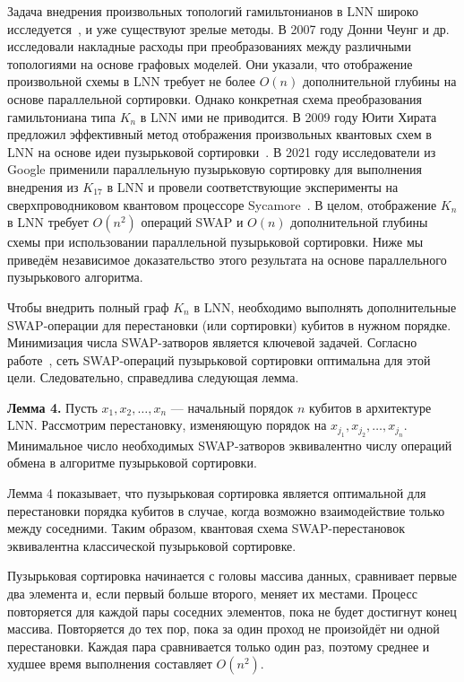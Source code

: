 Задача внедрения произвольных топологий гамильтонианов в LNN широко
исследуется~\cite{cite_53,cite_54,cite_55,cite_56,cite_57,cite_58,cite_59}, и
уже существуют зрелые методы. В 2007 году Донни Чеунг и др.~\cite{cite_55}
исследовали накладные расходы при преобразованиях между различными топологиями
на основе графовых моделей. Они указали, что отображение произвольной схемы в
LNN требует не более $O(n)$ дополнительной глубины на основе параллельной
сортировки. Однако конкретная схема преобразования гамильтониана типа $K_n$ в
LNN ими не приводится. В 2009 году Юити Хирата предложил эффективный метод
отображения произвольных квантовых схем в LNN на основе идеи пузырьковой
сортировки~\cite{cite_56}. В 2021 году исследователи из Google применили
параллельную пузырьковую сортировку для выполнения внедрения из $K_{17}$ в LNN
и провели соответствующие эксперименты на сверхпроводниковом квантовом
процессоре Sycamore~\cite{cite_11}. В целом, отображение $K_n$ в LNN требует
$O(n^2)$ операций SWAP и $O(n)$ дополнительной глубины схемы при использовании
параллельной пузырьковой сортировки. Ниже мы приведём независимое
доказательство этого результата на основе параллельного пузырькового алгоритма.

Чтобы внедрить полный граф $K_n$ в LNN, необходимо выполнять дополнительные
SWAP-операции для перестановки (или сортировки) кубитов в нужном порядке.
Минимизация числа SWAP-затворов является ключевой задачей. Согласно
работе~\cite{cite_56}, сеть SWAP-операций пузырьковой сортировки оптимальна для
этой цели. Следовательно, справедлива следующая лемма.

\textbf{Лемма 4.} Пусть $x_1, x_2, \dots, x_n$ — начальный порядок $n$ кубитов
в архитектуре LNN. Рассмотрим перестановку, изменяющую порядок на $x_{j_1},
x_{j_2}, \dots, x_{j_n}$. Минимальное число необходимых SWAP-затворов
эквивалентно числу операций обмена в алгоритме пузырьковой сортировки.

Лемма 4 показывает, что пузырьковая сортировка является оптимальной для
перестановки порядка кубитов в случае, когда возможно взаимодействие только
между соседними. Таким образом, квантовая схема SWAP-перестановок эквивалентна
классической пузырьковой сортировке.

Пузырьковая сортировка начинается с головы массива данных, сравнивает первые
два элемента и, если первый больше второго, меняет их местами. Процесс
повторяется для каждой пары соседних элементов, пока не будет достигнут конец
массива. Повторяется до тех пор, пока за один проход не произойдёт ни одной
перестановки. Каждая пара сравнивается только один раз, поэтому среднее и
худшее время выполнения составляет $O(n^2)$.

